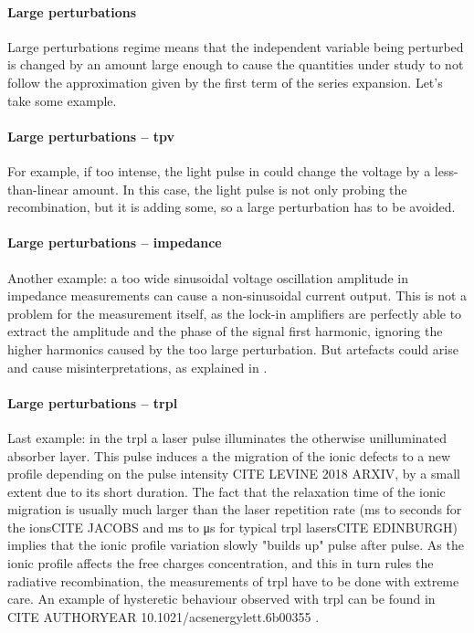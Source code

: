 \paragraph{Large perturbations} Large perturbations regime means that the independent variable being perturbed is changed by an amount large enough to cause the quantities under study to not follow the approximation given by the first term of the series expansion. Let's take some example.

\paragraph{Large perturbations -- \gls{tpv}} For example, if too intense, the light pulse in  could change the voltage by a less-than-linear amount. In this case, the light pulse is not only probing the recombination, but it is adding some, so a large perturbation has to be avoided.

\paragraph{Large perturbations -- impedance} Another example: a too wide sinusoidal voltage oscillation amplitude in impedance measurements can cause a non-sinusoidal current output. This is not a problem for the measurement itself, as the lock-in amplifiers are perfectly able to extract the amplitude and the phase of the signal first harmonic, ignoring the higher harmonics caused by the too large perturbation. But artefacts could arise and cause misinterpretations, as explained in .

\paragraph{Large perturbations -- \gls{trpl}} Last example: in the \glsdesc{trpl} a laser pulse illuminates the otherwise unilluminated absorber layer. This pulse induces a the migration of the ionic defects to a new profile depending on the pulse intensity CITE LEVINE 2018 ARXIV, by a small extent due to its short duration. The fact that the relaxation time of the ionic migration is usually much larger than the laser repetition rate (\si{\ms} to seconds for the ionsCITE JACOBS and \si{\ms} to \si{\us} for typical \gls{trpl} lasersCITE EDINBURGH) implies that the ionic profile variation slowly "builds up" pulse after pulse. As the ionic profile affects the free charges concentration, and this in turn rules the radiative recombination, the measurements of \gls{trpl} have to be done with extreme care. An example of hysteretic behaviour observed with \gls{trpl} can be found in CITE AUTHORYEAR 10.1021/acsenergylett.6b00355 .


